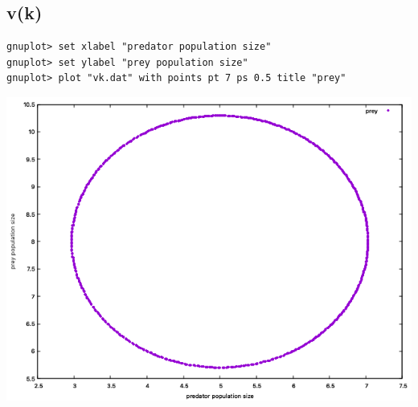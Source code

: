 \documentclass{article}
\begin{document}
\subsection*{v(k)}
\begin{lstlisting}
gnuplot> set xlabel "predator population size"
gnuplot> set ylabel "prey population size"
gnuplot> plot "vk.dat" with points pt 7 ps 0.5 title "prey"
\end{lstlisting}
\includegraphics[scale=0.6]{vk.png}
\end{document}
